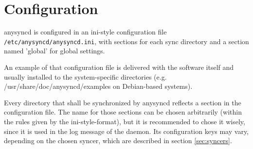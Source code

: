 \section{Configuration}
\label{sec:configuration}

anysyncd is configured in an ini-style configuration file \texttt{/etc/anysyncd/anysyncd.ini},
with sections for each sync directory and a section named 'global' for global
settings. 

An example of that configuration file is delivered with the software
itself and usually installed to the system-specific directories (e.g.
/usr/share/doc/anysyncd/examples on Debian-based systems).

Every directory that shall be synchronized by anysyncd reflects a section in
the configuration file. The name for those sections can be chosen arbitrarily
(within the rules given by the ini-style-format), but it is recommended to
chose it wisely, since it is used in the log message of the daemon. Its
configuration keys may vary, depending on the chosen syncer, which are described
in section \ref{sec:syncers}.

